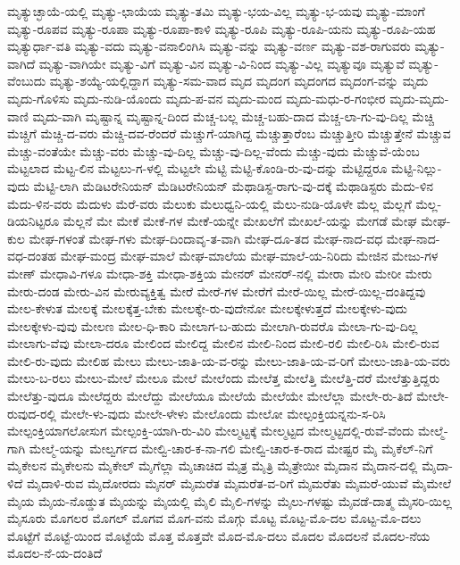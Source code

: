 ಮೃತ್ಯುಚ್ಛಾಯೆ-ಯಲ್ಲಿ
ಮೃತ್ಯು-ಛಾಯೆಯ
ಮೃತ್ಯು-ತಮಿ
ಮೃತ್ಯು-ಭಯ-ವಿಲ್ಲ
ಮೃತ್ಯು-ಭ-ಯವು
ಮೃತ್ಯು-ಮಾಂಗೆ
ಮೃತ್ಯು-ರೂಪವ
ಮೃತ್ಯು-ರೂಪಾ
ಮೃತ್ಯು-ರೂಪಾ-ಕಾಳಿ
ಮೃತ್ಯು-ರೂಪಿ
ಮೃತ್ಯು-ರೂಪಿ-ಯನು
ಮೃತ್ಯು-ರೂಪಿ-ಯಹ
ಮೃತ್ಯುರ್ಧಾ-ವತಿ
ಮೃತ್ಯು-ವದು
ಮೃತ್ಯು-ವನಾಲಿಂಗಿಸಿ
ಮೃತ್ಯು-ವನ್ನು
ಮೃತ್ಯು-ವರ್ಣ
ಮೃತ್ಯು-ವಶ-ರಾಗುವರು
ಮೃತ್ಯು-ವಾಗಿದೆ
ಮೃತ್ಯು-ವಾಗಿಯೇ
ಮೃತ್ಯು-ವಿಗೆ
ಮೃತ್ಯು-ವಿನ
ಮೃತ್ಯು-ವಿ-ನಿಂದ
ಮೃತ್ಯು-ವಿಲ್ಲ
ಮೃತ್ಯುವೂ
ಮೃತ್ಯುವೆ
ಮೃತ್ಯು-ವೆಂಬುದು
ಮೃತ್ಯು-ಶಯ್ಯೆ-ಯಲ್ಲಿದ್ದಾಗ
ಮೃತ್ಯು-ಸಮ-ವಾದ
ಮೃದ
ಮೃದಂಗ
ಮೃದಂಗದ
ಮೃದಂಗ-ವನ್ನು
ಮೃದು
ಮೃದು-ಗೊಳಿಸು
ಮೃದು-ನುಡಿ-ಯೊಂದು
ಮೃದು-ಪ-ವನ
ಮೃದು-ಮಂದ
ಮೃದು-ಮಧು-ರ-ಗಂಭೀರ
ಮೃದು-ಮೃದು-ವಾಣಿ
ಮೃದು-ವಾಗಿ
ಮೃಷ್ಟಾನ್ನ
ಮೃಷ್ಟಾನ್ನ-ದಿಂದ
ಮೆಚ್ಚ-ಬಲ್ಲ
ಮೆಚ್ಚ-ಬಹು-ದಾದ
ಮೆಚ್ಚ-ಲಾ-ಗು-ವು-ದಿಲ್ಲ
ಮೆಚ್ಚಿ
ಮೆಚ್ಚಿಗೆ
ಮೆಚ್ಚಿ-ದ-ವರು
ಮೆಚ್ಚಿ-ದವ-ರೆಂದರೆ
ಮೆಚ್ಚುಗೆ-ಯಾಗಿದ್ದ
ಮೆಚ್ಚುತ್ತಾರೆಂಬ
ಮೆಚ್ಚುತ್ತೀರಿ
ಮೆಚ್ಚುತ್ತೇನೆ
ಮೆಚ್ಚುವ
ಮೆಚ್ಚು-ವಂತೆಯೇ
ಮೆಚ್ಚು-ವರು
ಮೆಚ್ಚು-ವು-ದಿಲ್ಲ
ಮೆಚ್ಚು-ವು-ದಿಲ್ಲ-ವೆಂದು
ಮೆಚ್ಚು-ವುದು
ಮೆಚ್ಚುವೆ-ಯೆಂಬ
ಮೆಟ್ಟಲಾದ
ಮೆಟ್ಟ-ಲಿನ
ಮೆಟ್ಟಲು-ಗ-ಳಲ್ಲಿ
ಮೆಟ್ಟಲೇ
ಮೆಟ್ಟಿ
ಮೆಟ್ಟಿ-ಕೊಂಡಿ-ರು-ವು-ದನ್ನು
ಮೆಟ್ಟಿದ್ದರೂ
ಮೆಟ್ಟಿ-ನಿಲ್ಲು-ವುದು
ಮೆಟ್ಟಿ-ಲಾಗಿ
ಮೆಡಿಟರೇನಿಯನ್
ಮೆಡಿಟರೇನಿಯನ್‌
ಮೆಥಾಡಿಸ್ಟ-ರಾಗು-ವು-ದಕ್ಕೆ
ಮೆಥಾಡಿಸ್ಟರು
ಮೆದು-ಳಿನ
ಮೆದು-ಳಿನ-ವರು
ಮೆದುಳು
ಮೆರೆ-ವರು
ಮೆಲುಕು
ಮೆಲುಧ್ವನಿ-ಯಲ್ಲಿ
ಮೆಲು-ನುಡಿ-ಯೊಳೇ
ಮೆಲ್ಲ
ಮೆಲ್ಲಗೆ
ಮೆಲ್ಲ-ಡಿಯನಿಟ್ಟರೂ
ಮೆಲ್ಲನೆ
ಮೇ
ಮೇಕೆ
ಮೇಕೆ-ಗಳ
ಮೇಕೆ-ಯನ್ನೇ
ಮೇಖಲೆಗೆ
ಮೇಖಲೆ-ಯನ್ನು
ಮೇಗಡೆ
ಮೇಘ
ಮೇಘ-ಕುಲ
ಮೇಘ-ಗಳಂತೆ
ಮೇಘ-ಗಳು
ಮೇಘ-ದಿಂದಾವೃ-ತ-ವಾಗಿ
ಮೇಘ-ದೂ-ತದ
ಮೇಘ-ನಾದ-ವಧ
ಮೇಘ-ನಾದ-ವಧ-ದಂತಹ
ಮೇಘ-ಮಂದ್ರ
ಮೇಘ-ಮಾಲೆ
ಮೇಘ-ಮಾಲೆಯ
ಮೇಘ-ಮಾಲೆ-ಯ-ನಿರಿದು
ಮೇಜಿನ
ಮೇಜು-ಗಳ
ಮೇಣ್
ಮೇಧಾವಿ-ಗಳೂ
ಮೇಧಾ-ಶಕ್ತಿ
ಮೇಧಾ-ಶಕ್ತಿಯ
ಮೇನರ್
ಮೇನರ್‌-ನಲ್ಲಿ
ಮೇರಾ
ಮೇರಿ
ಮೇರೀ
ಮೇರು
ಮೇರು-ದಂಡ
ಮೇರು-ವಿನ
ಮೇರುವ್ಯಕ್ತಿತ್ವ
ಮೇರೆ
ಮೇರೆ-ಗಳ
ಮೇರೆಗೆ
ಮೇರೆ-ಯಿಲ್ಲ
ಮೇರೆ-ಯಿಲ್ಲ-ದಂತಿದ್ದವು
ಮೇಲ-ಕೇಳುತ
ಮೇಲಕ್ಕೆ
ಮೇಲಕ್ಕೆತ್ತ-ಬೇಕು
ಮೇಲಕ್ಕೇ-ರು-ವುದೇನೋ
ಮೇಲಕ್ಕೇಳುತ್ತದೆ
ಮೇಲಕ್ಕೇಳು-ವುದು
ಮೇಲಕ್ಕೇಳು-ವುವು
ಮೇಲಣ
ಮೇಲ-ಧಿ-ಕಾರಿ
ಮೇಲಾಗ-ಬ-ಹುದು
ಮೇಲಾಗಿ-ರುವರೊ
ಮೇಲಾ-ಗು-ವು-ದಿಲ್ಲ
ಮೇಲಾಗು-ವೆವು
ಮೇಲಾ-ದರೂ
ಮೇಲಿಂದ
ಮೇಲಿದ್ದ
ಮೇಲಿನ
ಮೇಲಿ-ನಿಂದ
ಮೇಲಿ-ರಲಿ
ಮೇಲಿ-ರಿಸಿ
ಮೇಲಿ-ರುವ
ಮೇಲಿ-ರು-ವುದು
ಮೇಲಿಹ
ಮೇಲು
ಮೇಲು-ಜಾತಿ-ಯ-ವ-ರನ್ನು
ಮೇಲು-ಜಾತಿ-ಯ-ವ-ರಿಗೆ
ಮೇಲು-ಜಾತಿ-ಯ-ವರು
ಮೇಲು-ಬ-ರಲು
ಮೇಲು-ಮೇಲೆ
ಮೇಲೂ
ಮೇಲೆ
ಮೇಲೆಂದು
ಮೇಲೆತ್ತ
ಮೇಲೆತ್ತಿ
ಮೇಲೆತ್ತಿ-ದರೆ
ಮೇಲೆತ್ತುತ್ತಿದ್ದರು
ಮೇಲೆತ್ತು-ವುದೂ
ಮೇಲೆದ್ದರು
ಮೇಲೆದ್ದು
ಮೇಲೆಯೂ
ಮೇಲೆಯೆ
ಮೇಲೆಯೇ
ಮೇಲೆಲ್ಲಾ
ಮೇಲೇ-ರು-ತಿದೆ
ಮೇಲೇ-ರುವುದ-ರಲ್ಲಿ
ಮೇಲೇ-ಳು-ವುದು
ಮೇಲೇ-ಳೇಳು
ಮೇಲೊಂದು
ಮೇಲೋ
ಮೇಲ್ಪಂಕ್ತಿಯನ್ನನು-ಸ-ರಿಸಿ
ಮೇಲ್ಪಂಕ್ತಿಯಾಗಲೋಸುಗ
ಮೇಲ್ಪಂಕ್ತಿ-ಯಾಗಿ-ರು-ವಿರಿ
ಮೇಲ್ಮಟ್ಟಕ್ಕೆ
ಮೇಲ್ಮಟ್ಟದ
ಮೇಲ್ಮಟ್ಟದಲ್ಲಿ-ರುವೆ-ವೆಂದು
ಮೇಲ್ಮೆ-ಗಾಗಿ
ಮೇಲ್ಮೆ-ಯನ್ನು
ಮೇಲ್ವರ್ಗದ
ಮೇಲ್ವಿ-ಚಾರ-ಕ-ನಾ-ಗಲಿ
ಮೇಲ್ವಿ-ಚಾರ-ಕ-ರಾದ
ಮೇಷ್ಟರ
ಮೈ
ಮೈಕೆಲ್‌-ನಿಗೆ
ಮೈಕೇಲನ
ಮೈಕೇಲನು
ಮೈಕೇಲ್
ಮೈಗೆಲ್ಲಾ
ಮೈಚಾಚಿದ
ಮೈತ್ರ
ಮೈತ್ರಿ
ಮೈತ್ರೇಯೀ
ಮೈದಾನ
ಮೈದಾನ-ದಲ್ಲಿ
ಮೈದಾ-ಳಿದೆ
ಮೈದಾಳಿ-ರುವ
ಮೈದೋರದು
ಮೈನರ್‌
ಮೈಮರೆತ
ಮೈಮರೆತ-ವ-ರಿಗೆ
ಮೈಮರೆತು
ಮೈಮರೆ-ಯುವೆ
ಮೈಮೇಲೆ
ಮೈಯ
ಮೈಯ-ನೊಡ್ಡುತ
ಮೈಯನ್ನು
ಮೈಯಲ್ಲಿ
ಮೈಲಿ
ಮೈಲಿ-ಗಳನ್ನು
ಮೈಲು-ಗಳಷ್ಟು
ಮೈವಡೆ-ದಾತ್ಮ
ಮೈಸರಿ-ಯಿಲ್ಲ
ಮೈಸೂರು
ಮೊಗಲರ
ಮೊಗಲ್
ಮೊಗವ
ಮೊಗ-ವನು
ಮೊಗ್ಗು
ಮೊಟ್ಟ
ಮೊಟ್ಟ-ಮೊ-ದಲ
ಮೊಟ್ಟ-ಮೊ-ದಲು
ಮೊಟ್ಟೆಗೆ
ಮೊಟ್ಟೆ-ಯಿಂದ
ಮೊಟ್ಟೆಯೆ
ಮೊತ್ತ
ಮೊತ್ತವೇ
ಮೊದ-ಮೊ-ದಲು
ಮೊದಲ
ಮೊದಲನೆ
ಮೊದಲ-ನೆಯ
ಮೊದಲ-ನೆ-ಯ-ದಂತಿದೆ
